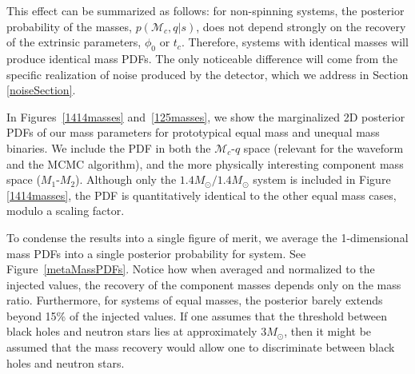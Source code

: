 \documentclass[11pt,a4paper]{emulateapj}
\newcommand{\carl}[1]{{\color{red}  #1}}
\newcommand{\chmass}{\mathcal{M}_c}
\begin{document}
This effect can be summarized as follows: for non-spinning systems, the posterior probability of the masses,
$p(\chmass, q | s)$, does not depend strongly on the recovery of the extrinsic parameters, $\phi_0$ or $t_c$.  Therefore, 
systems with identical masses will produce identical mass PDFs.  The only noticeable difference will come from
 the specific realization of noise produced by the detector, which we address in Section \ref{noiseSection}.




In Figures~\ref{1414masses} and~\ref{125masses}, we show the marginalized 2D posterior PDFs of our
 mass parameters for  prototypical equal mass and unequal mass binaries.  We include the PDF in both
  the $\chmass$-$q$ space (relevant for the waveform and the MCMC algorithm), and the more physically 
  interesting component mass space ($M_1$-$M_2$).  Although only the $1.4M_{\odot}/1.4M_{\odot}$ system
   is included in Figure \ref{1414masses}, the PDF is quantitatively identical to the other equal mass cases, 
   modulo a scaling factor. 

To condense the results into a single figure of merit, we average the 1-dimensional mass PDFs into a single 
posterior probability for system.  See Figure~\ref{metaMassPDFs}.  Notice how when averaged and
 normalized to the injected values, the recovery of the component masses depends only on the mass ratio.  
 Furthermore, for systems of equal masses, the posterior barely extends beyond 15\% of the injected values.  
 If one assumes that the threshold between black
   holes and neutron stars lies at approximately $3M_{\odot}$, then it might be assumed that
   the mass recovery would allow one to discriminate between black holes and neutron stars.
   
\end{document}
